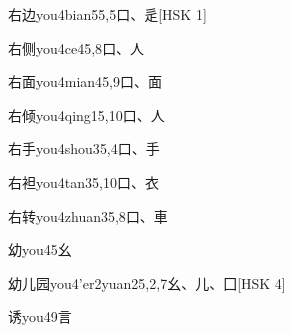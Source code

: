 \begin{EntryWithPhonetic}{右边}{you4bian5}{5,5}{⼝、⾡}[HSK 1]
\end{EntryWithPhonetic}

\begin{EntryWithPhonetic}{右侧}{you4ce4}{5,8}{⼝、⼈}
\end{EntryWithPhonetic}

\begin{EntryWithPhonetic}{右面}{you4mian4}{5,9}{⼝、⾯}
\end{EntryWithPhonetic}

\begin{EntryWithPhonetic}{右倾}{you4qing1}{5,10}{⼝、⼈}
\end{EntryWithPhonetic}

\begin{EntryWithPhonetic}{右手}{you4shou3}{5,4}{⼝、⼿}
\end{EntryWithPhonetic}

\begin{EntryWithPhonetic}{右袒}{you4tan3}{5,10}{⼝、⾐}
\end{EntryWithPhonetic}

\begin{EntryWithPhonetic}{右转}{you4zhuan3}{5,8}{⼝、⾞}
\end{EntryWithPhonetic}

\begin{EntryWithPhonetic}{幼}{you4}{5}{⼳}
\end{EntryWithPhonetic}

\begin{EntryWithPhonetic}{幼儿园}{you4'er2yuan2}{5,2,7}{⼳、⼉、⼞}[HSK 4]
\end{EntryWithPhonetic}

\begin{EntryWithPhonetic}{诱}{you4}{9}{⾔}
\end{EntryWithPhonetic}

